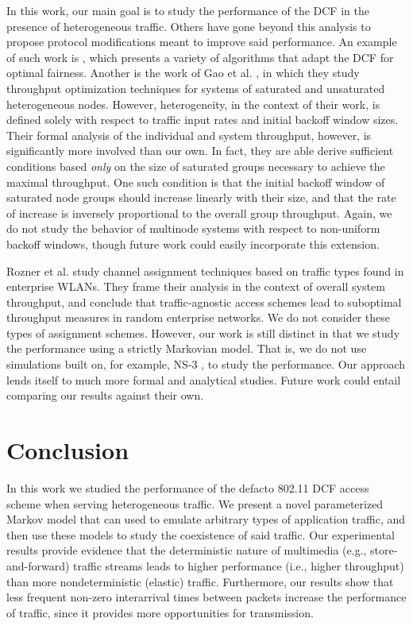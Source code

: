 \documentclass{llncs}
\begin{document}
In this work, our main goal is to study the performance of the DCF in the presence of heterogeneous traffic. Others have gone beyond this analysis to propose protocol modifications meant to improve said performance. An example of such work is \cite{li2008predictable}, which presents a variety of algorithms that adapt the DCF for optimal fairness. Another is the work of Gao et al. \cite{gao2013throughput}, in which they study throughput optimization techniques for systems of saturated and unsaturated heterogeneous nodes. However, heterogeneity, in the context of their work, is defined solely with respect to traffic input rates and initial backoff window sizes. Their formal analysis of the individual and system throughput, however, is significantly more involved than our own. In fact, they are able derive sufficient conditions based \emph{only} on the size of saturated groups necessary to achieve the maximal throughput. One such condition is that the initial backoff window of saturated node groups should increase linearly with their size, and that the rate of increase is inversely proportional to the overall group throughput. Again, we do not study the behavior of multinode systems with respect to non-uniform backoff windows, though future work could easily incorporate this extension.

Rozner et al. \cite{rozner2007traffic} study channel assignment techniques based on traffic types found in enterprise WLANs. They frame their analysis in the context of overall system throughput, and conclude that traffic-agnostic access schemes lead to suboptimal throughput measures in random enterprise networks. We do not consider these types of assignment schemes. However, our work is still distinct in that we study the performance using a strictly Markovian model. That is, we do not use simulations built on, for example, NS-3 \cite{henderson2008network}, to study the performance. Our approach lends itself to much more formal and analytical studies. Future work could entail comparing our results against their own.

\section{Conclusion}
In this work we studied the performance of the defacto 802.11 DCF access scheme when serving heterogeneous traffic. We present a novel parameterized Markov model that can used to emulate arbitrary types of application traffic, and then use these models to study the coexistence of said traffic. Our experimental results provide evidence that the deterministic nature of multimedia (e.g., store-and-forward) traffic streams leads to higher performance (i.e., higher throughput) than more nondeterministic (elastic) traffic. Furthermore, our results show that less frequent non-zero interarrival times between packets increase the performance of traffic, since it provides more opportunities for transmission.




\end{document}
